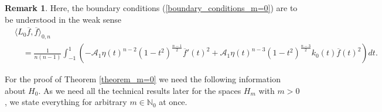 \documentclass[12pt,twoside]{amsart}
\numberwithin{satz}{section}
\theoremstyle{definition}
\newtheorem{remark}[satz]{Remark}
\numberwithin{equation}{section}
\newcommand\N{\mathbb{N}}
\begin{document}
	\begin{remark}
		Here, the boundary conditions (\ref{boundary_conditions_m=0}) are to be understood in the weak sense
		\begin{align}\label{weak_formulation}
			&\langle L_0\overline{f},\overline{f}\rangle_{0,n} \nonumber \\
			& \quad =\frac{1}{n(n-1)}\int_{-1}^1 \left(-\mathcal{A}_1\eta(t)^{n-2}(1-t^2)^{\frac{n-1}{2}}\overline{f}'(t)^2+ \mathcal{A}_1\eta(t)^{n-3}(1-t^2)^{\frac{n-3}{2}}k_0(t)\overline{f}(t)^2\right)dt.
		\end{align}
	\end{remark}
	
	For the proof of Theorem \ref{theorem_m=0} we need the following information about $H_0$. As we need all the technical results later for the spaces $H_m$ with $m>0$, we state everything for arbitrary $m\in\N_0$ at once.
	
\end{document}
